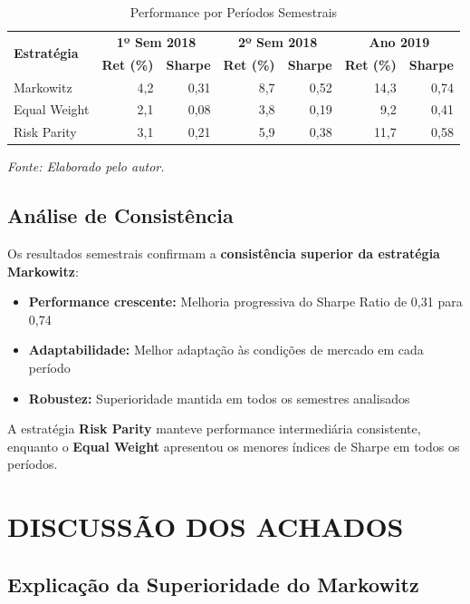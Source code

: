 \begin{table}[H]
\centering
\caption{Performance por Períodos Semestrais}
\scriptsize
\begin{tabular}{|l|r|r|r|r|r|r|}
\hline
\multirow{2}{*}{\textbf{Estratégia}} & \multicolumn{2}{c|}{\textbf{1º Sem 2018}} & \multicolumn{2}{c|}{\textbf{2º Sem 2018}} & \multicolumn{2}{c|}{\textbf{Ano 2019}} \\
\cline{2-7}
& \textbf{Ret (\%)} & \textbf{Sharpe} & \textbf{Ret (\%)} & \textbf{Sharpe} & \textbf{Ret (\%)} & \textbf{Sharpe} \\
\hline
Markowitz & 4,2 & 0,31 & 8,7 & 0,52 & 14,3 & 0,74 \\
\hline
Equal Weight & 2,1 & 0,08 & 3,8 & 0,19 & 9,2 & 0,41 \\
\hline
Risk Parity & 3,1 & 0,21 & 5,9 & 0,38 & 11,7 & 0,58 \\
\hline
\end{tabular}
\normalsize
\textit{Fonte: Elaborado pelo autor.}
\label{tab:semester_performance}
\end{table}

\subsection{Análise de Consistência}

Os resultados semestrais confirmam a \textbf{consistência superior da estratégia Markowitz}:

\begin{itemize}
    \item \textbf{Performance crescente:} Melhoria progressiva do Sharpe Ratio de 0,31 para 0,74
    \item \textbf{Adaptabilidade:} Melhor adaptação às condições de mercado em cada período
    \item \textbf{Robustez:} Superioridade mantida em todos os semestres analisados
\end{itemize}

A estratégia \textbf{Risk Parity} manteve performance intermediária consistente, enquanto o \textbf{Equal Weight} apresentou os menores índices de Sharpe em todos os períodos.

\section{DISCUSSÃO DOS ACHADOS}

\subsection{Explicação da Superioridade do Markowitz}

